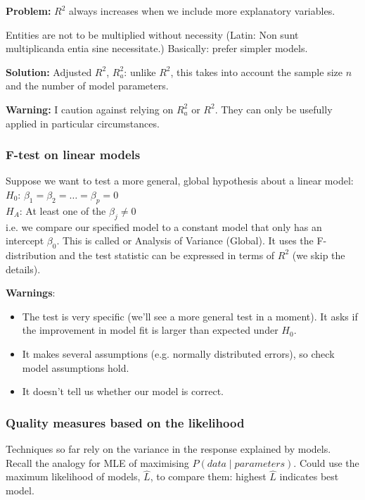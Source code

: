 \textbf{Problem:} $R^2$ always increases when we include more explanatory variables.

\begin{proposition}
	\label{occams_razor}
	Entities are not to be multiplied without necessity (Latin: Non sunt multiplicanda entia sine necessitate.) Basically: prefer simpler models.
\end{proposition}

\textbf{Solution:} Adjusted $R^2$, $R^2_a$: unlike $R^2$, this takes into account the sample size $n$ and the number of model parameters.

\textbf{Warning:} I caution against relying on $R^2_a$ or $R^2$. They can only be usefully applied in particular circumstances.

\subsubsection{F-test on linear models}

Suppose we want to test a more general, global hypothesis about a linear model: \\
$H_0$: $\beta_1=\beta_2=\dots=\beta_p=0$ \\
$H_A$: At least one of the $\beta_j\neq 0$ \\
i.e. we compare our specified model to a constant model that only has an intercept $\beta_0$. This is called  or Analysis of Variance (Global). It uses the F-distribution and the test statistic can be expressed in terms of $R^2$ (we skip the details).

\textbf{Warnings}:
\begin{itemize}
	\item The test is very specific (we'll see a more general test in a moment). It asks if the improvement in model fit is larger than expected under $H_0$.
	\item It makes several assumptions (e.g. normally distributed errors), so check model assumptions hold.
	\item It doesn't tell us whether our model is correct.
\end{itemize}

\subsubsection{Quality measures based on the likelihood}

Techniques so far rely on the variance in the response explained by models. Recall the analogy for MLE of maximising $P(data\mid parameters)$. Could use the maximum likelihood of models, $\hat{L}$, to compare them: highest $\hat{L}$ indicates best model.

